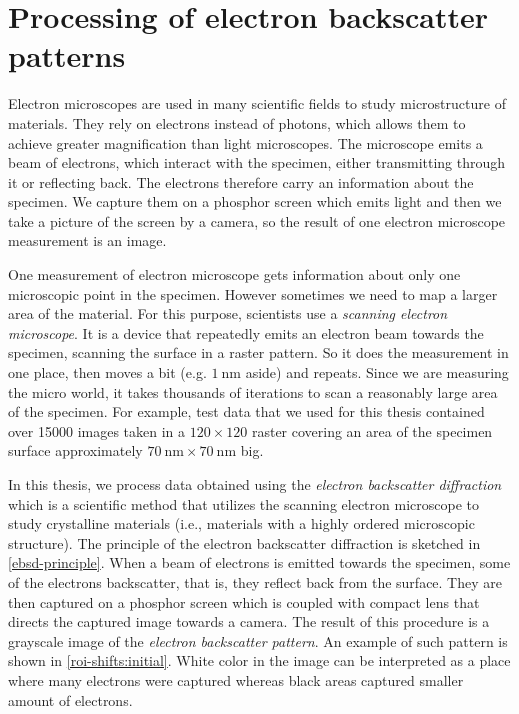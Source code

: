 \chapter{Processing of electron backscatter patterns}

Electron microscopes are used in many scientific fields to study microstructure of materials. They rely on electrons instead of photons, which allows them to achieve greater magnification than light microscopes. The microscope emits a beam of electrons, which interact with the specimen, either transmitting through it or reflecting back. The electrons therefore carry an information about the specimen. We capture them on a phosphor screen which emits light and then we take a picture of the screen by a camera, so the result of one electron microscope measurement is an image.

One measurement of electron microscope gets information about only one microscopic point in the specimen. However sometimes we need to map a larger area of the material. For this purpose, scientists use a \emph{scanning electron microscope}. It is a device that repeatedly emits an electron beam towards the specimen, scanning the surface in a raster pattern. So it does the measurement in one place, then moves a bit (e.g. $\SI{1}{\nano\meter}$ aside) and repeats. Since we are measuring the micro world, it takes thousands of iterations to scan a reasonably large area of the specimen. For example, test data that we used for this thesis contained over 15000 images taken in a $120 \times 120$ raster covering an area of the specimen surface approximately $\SI{70}{\nano\meter} \times \SI{70}{\nano\meter}$ big.

In this thesis, we process data obtained using the \emph{electron backscatter diffraction} which is a scientific method that utilizes the scanning electron microscope to study crystalline materials (i.e., materials with a highly ordered microscopic structure). The principle of the electron backscatter diffraction is sketched in \cref{ebsd-principle}. When a beam of electrons is emitted towards the specimen, some of the electrons backscatter, that is, they reflect back from the surface. They are then captured on a phosphor screen which is coupled with compact lens that directs the captured image towards a camera. The result of this procedure is a grayscale image of the \emph{electron backscatter pattern}. An example of such pattern is shown in \cref{roi-shifts:initial}. White color in the image can be interpreted as a place where many electrons were captured whereas black areas captured smaller amount of electrons.

